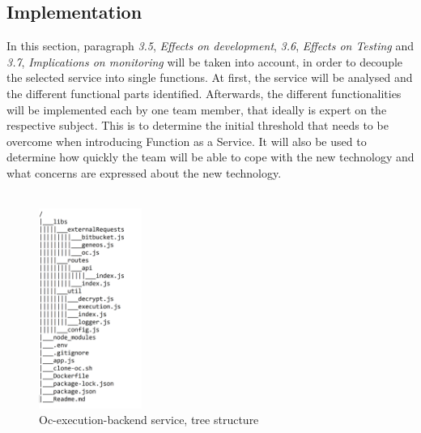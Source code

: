 \documentclass[a4paper,11pt, pagesize]{scrartcl}
\begin{document}
\begin{spacing}{1.2}
\subsection{Implementation}
In this section, paragraph \textit{3.5}, \textit{Effects on development}, \textit{3.6}, \textit{Effects on Testing} and \textit{3.7}, \textit{Implications on monitoring} will be taken into account, in order to decouple the selected service into single functions. At first, the service will be analysed and the different functional parts identified. Afterwards, the different functionalities will be implemented each by one team member, that ideally is expert on the respective subject. This is to determine the initial threshold that needs to be overcome when introducing Function as a Service. It will also be used to determine how quickly the team will be able to cope with the new technology and what concerns are expressed about the new technology.\\\\
\begin{figure}[H]
\label{fig:tree}
\centering
\includegraphics[width=0.3\textwidth]{tree.png}
\caption{Oc-execution-backend service, tree structure}
\end{figure}

\end{spacing}
\end{document}
